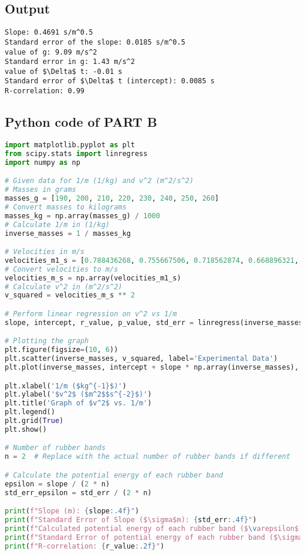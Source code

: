 \documentclass[a4paper,11pt]{article}
\begin{document}
\subsection*{Output}
\begin{lstlisting}
Slope: 0.4691 s/m^0.5
Standard error of the slope: 0.0185 s/m^0.5
value of g: 9.09 m/s^2
Standard error in g: 1.43 m/s^2
value of $\Delta$ t: -0.01 s
Standard error of $\Delta$ t (intercept): 0.0085 s
R-correlation: 0.99
\end{lstlisting}
\newpage
\subsection*{Python code of PART B}
\begin{lstlisting}[language=Python]
import matplotlib.pyplot as plt
from scipy.stats import linregress
import numpy as np

# Given data for 1/m (1/kg) and v^2 (m^2/s^2)
# Masses in grams
masses_g = [190, 200, 210, 220, 230, 240, 250, 260]
# Convert masses to kilograms
masses_kg = np.array(masses_g) / 1000
# Calculate 1/m in (1/kg)
inverse_masses = 1 / masses_kg

# Velocities in m/s
velocities_m1_s = [0.788436268, 0.755667506, 0.718562874, 0.668896321, 0.643776824, 0.617283951, 0.614124872, 0.598802395]
# Convert velocities to m/s
velocities_m_s = np.array(velocities_m1_s)
# Calculate v^2 in (m^2/s^2)
v_squared = velocities_m_s ** 2

# Perform linear regression on v^2 vs 1/m
slope, intercept, r_value, p_value, std_err = linregress(inverse_masses, v_squared)

# Plotting the graph
plt.figure(figsize=(10, 6))
plt.scatter(inverse_masses, v_squared, label='Experimental Data')
plt.plot(inverse_masses, intercept + slope * np.array(inverse_masses), 'r', label=f'Linear Fit: $v^2 = {slope:.4f}(1/m) + {intercept:.4f}$')

plt.xlabel('1/m ($kg^{-1}$)')
plt.ylabel('$v^2$ ($m^2$$s^{-2}$)')
plt.title('Graph of $v^2$ vs. 1/m')
plt.legend()
plt.grid(True)
plt.show()

# Number of rubber bands
n = 2  # Replace with the actual number of rubber bands if different

# Calculate the potential energy of each rubber band
epsilon = slope / (2 * n)
std_err_epsilon = std_err / (2 * n)

print(f"Slope (m): {slope:.4f}")
print(f"Standard Error of Slope ($\sigma$m): {std_err:.4f}")
print(f"Calculated potential energy of each rubber band ($\varepsilon$): {epsilon:.4f} J")
print(f"Standard Error of potential energy of each rubber band ($\sigma$$\varepsilon$): {std_err_epsilon:.4f} J")
print(f"R-correlation: {r_value:.2f}")
\end{lstlisting}
\end{document}
